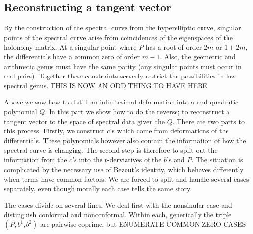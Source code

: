 \subsection{Reconstructing a tangent vector}
By the construction of the spectral curve from the hyperelliptic curve, singular points of the spectral curve arise from coincidences of the eigenspaces of the holonomy matrix. At a singular point where $P$ has a root of order $2m$ or $1+2m$, the differentials have a common zero of order $m-1$. Also, the geometric and arithmetic genus must have the same parity (any singular points must occur in real pairs). Together these constraints serverly restrict the possibilities in low spectral genus. THIS IS NOW AN ODD THING TO HAVE HERE 

Above we saw how to distill an infinitesimal deformation into a real quadratic polynomial $Q$. In this part we show how to do the reverse; to reconstruct a tangent vector to the space of spectral data given the $Q$. There are two parts to this process. Firstly, we construct $c$'s which come from deformations of the differentials. These polynomials however also contain the information of how the spectral curve is changing. The second step is therefore to split out the information from the $c$'s into the $t$-derviatives of the $b$'s and $P$. The situation is complicated by the necessary use of Bezout's identity, which behaves differently when terms have common factors. We are forced to split and handle several cases separately, even though morally each case tells the same story.

The cases divide on several lines. We deal first with the nonsinular case and distinguish conformal and nonconformal. Within each, generically the triple $(P,b^1,b^2)$ are pairwise coprime, but ENUMERATE COMMON ZERO CASES 

